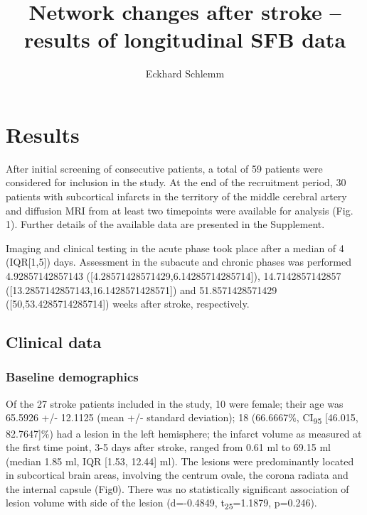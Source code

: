 \documentclass[]{article}
\title{Network changes after stroke -- results of longitudinal SFB data}
\author{Eckhard Schlemm}
\date{}
\begin{document}
\maketitle

\hypertarget{results}{%
\section{Results}\label{results}}

After initial screening of consecutive patients, a total of 59 patients
were considered for inclusion in the study. At the end of the
recruitment period, 30 patients with subcortical infarcts in the
territory of the middle cerebral artery and diffusion MRI from at least
two timepoints were available for analysis (Fig. 1). Further details of
the available data are presented in the Supplement.

Imaging and clinical testing in the acute phase took place after a
median of 4 (IQR{[}1,5{]}) days. Assessment in the subacute and chronic
phases was performed 4.92857142857143
({[}4.28571428571429,6.14285714285714{]}), 14.7142857142857
({[}13.2857142857143,16.1428571428571{]}) and 51.8571428571429
({[}50,53.4285714285714{]}) weeks after stroke, respectively.

\hypertarget{clinical-data}{%
\subsection{Clinical data}\label{clinical-data}}

\hypertarget{baseline-demographics}{%
\subsubsection{Baseline demographics}\label{baseline-demographics}}

Of the 27 stroke patients included in the study, 10 were female; their
age was 65.5926 +/- 12.1125 (mean +/- standard deviation); 18
(66.6667\%, CI\textsubscript{95} {[}46.015, 82.7647{]}\%) had a lesion
in the left hemisphere; the infarct volume as measured at the first time
point, 3-5 days after stroke, ranged from 0.61 ml to 69.15 ml (median
1.85 ml, IQR {[}1.53, 12.44{]} ml). The lesions were predominantly
located in subcortical brain areas, involving the centrum ovale, the
corona radiata and the internal capsule (Fig0). There was no
statistically significant association of lesion volume with side of the
lesion (d=-0.4849, t\textsubscript{25}=1.1879, p=0.246).
\end{document}
